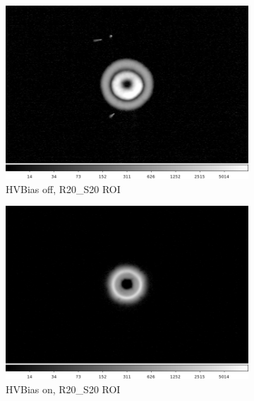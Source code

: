 \begin{figure}[!htbp]
\begin{subfigure}{0.35\textwidth}
     \includegraphics[width=\textwidth]{sections/figures/phosphorescence-survey/hvbias_comp_R20_S20_off.png}
     \caption{HVBias off, R20\_S20 ROI}
     \label{subfig:hvb_off_R20_S20}
 \end{subfigure}
 \begin{subfigure}{0.35\textwidth}
     \includegraphics[width=\textwidth]{sections/figures/phosphorescence-survey/hvbias_comp_R20_S20_on.png}
     \caption{HVBias on, R20\_S20 ROI}
     \label{subfig:hvb_on_R20_S20}
 \end{subfigure}
 \newline
 \begin{subfigure}{0.35\textwidth}

\end{subfigure}
\end{figure}
